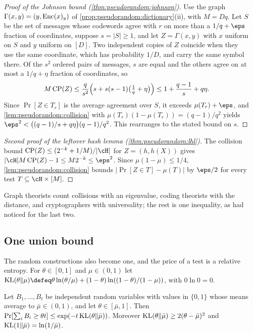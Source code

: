 \begin{refsection}
\begin{proof}[Proof of the Johnson bound (\cref{thm:pseudorandom:johnson})]
Use the graph $\Gamma(x,y)=(y,\operatorname{Enc}(x)_y)$ of \cref{prop:pseudorandom:dictionary}(ii), with $M=Dq$. Let $S$ be the set of messages whose codewords agree with $r$ on more than a $1/q+\eps$ fraction of coordinates, suppose $s=|S|\ge1$, and let $Z=\Gamma(x,y)$ with $x$ uniform on $S$ and $y$ uniform on $[D]$. Two independent copies of $Z$ coincide when they use the same coordinate, which has probability $1/D$, and carry the same symbol there. Of the $s^2$ ordered pairs of messages, $s$ are equal and the others agree on at most a $1/q+\eta$ fraction of coordinates, so
\[
  M\operatorname{CP}(Z)\le\frac q{s^2}\Bigl(s+s(s-1)\bigl(\tfrac1q+\eta\bigr)\Bigr)\le1+\frac{q-1}s+q\eta .
\]
Since $\Pr[Z\in T_r]$ is the average agreement over $S$, it exceeds $\mu(T_r)+\eps$, and \cref{lem:pseudorandom:collision} with $\mu(T_r)(1-\mu(T_r))=(q-1)/q^2$ yields $\eps^2<\bigl((q-1)/s+q\eta\bigr)(q-1)/q^2$. This rearranges to the stated bound on $s$.
\end{proof}

\begin{proof}[Second proof of the leftover hash lemma (\cref{thm:pseudorandom:lhl})]
The collision bound $\pseudorandomCP(Z)\le(2^{-k}+1/M)/|\cH|$ for $Z=(h,h(X))$ gives $|\cH|M\pseudorandomCP(Z)-1\le M2^{-k}\le\eps^2$. Since $\mu(1-\mu)\le1/4$, \cref{lem:pseudorandom:collision} bounds $|\Pr[Z\in T]-\mu(T)|$ by $\eps/2$ for every test $T\subseteq\cH\times[M]$.
\end{proof}

Graph theorists count collisions with an eigenvalue, coding theorists with the distance, and cryptographers with universality; the rest is one inequality, as \textcite{TaShmaZuckerman2004} had noticed for the last two.

\subsection{One union bound}\label{sec:pseudorandom:union}

The random constructions also become one, and the price of a test is a relative entropy. For $\theta\in[0,1]$ and $\mu\in(0,1)$ let $\pseudorandomKL(\theta\Vert\mu)\defeq\theta\ln(\theta/\mu)+(1-\theta)\ln((1-\theta)/(1-\mu))$, with $0\ln0=0$.

\begin{lemma}\label{lem:pseudorandom:chernoff}
Let $B_1,\dots,B_t$ be independent random variables with values in $\{0,1\}$ whose means average to $\bar\mu\in(0,1)$, and let $\theta\in[\bar\mu,1]$. Then $\Pr[\sum_iB_i\ge\theta t]\le\exp(-t\operatorname{KL}(\theta\Vert\bar\mu))$. Moreover $\operatorname{KL}(\theta\Vert\bar\mu)\ge2(\theta-\bar\mu)^2$ and $\operatorname{KL}(1\Vert\bar\mu)=\ln(1/\bar\mu)$.
\end{lemma}


\end{refsection}
